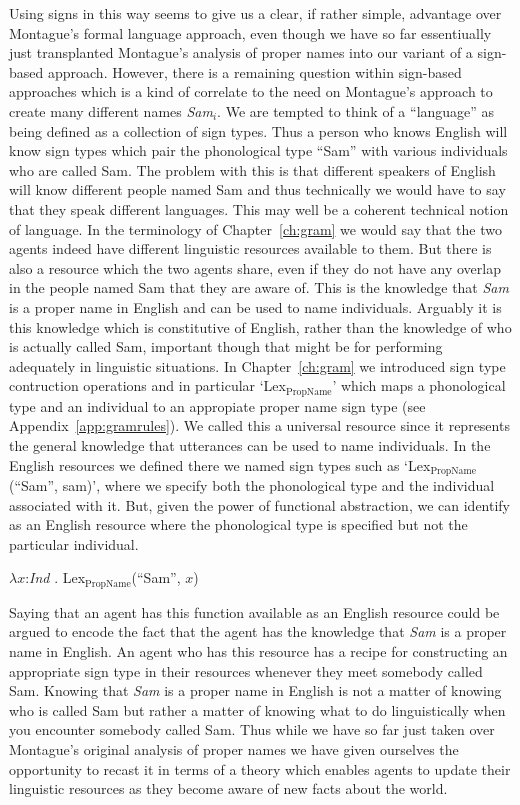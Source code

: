 Using signs in this way seems to give us a clear, if rather simple,
advantage over Montague's formal language approach, even though we
have so far essentiually just transplanted Montague's analysis of
proper names into our variant of a sign-based approach.  However,
there is a remaining question within sign-based approaches which is
a kind of correlate to the need on Montague's approach to create many
different names \textit{Sam}$_i$.  We are tempted to think of a
``language'' as being defined as a collection of sign types.  Thus a
person who knows English will know sign types which pair the
phonological type ``Sam'' with various individuals who are called
Sam.  The problem with this is that different speakers of English will
know different people named Sam and thus technically we would have to
say that they speak different languages.  This may well be a coherent
technical notion of language.  In the terminology of
Chapter~\ref{ch:gram} we would say that the two agents indeed have
different linguistic resources available to them.  But there is also a
resource which the two agents share, even if they do not have any
overlap in the people named Sam that they are aware of.  This is the
knowledge that \textit{Sam} is a proper name in English and can be
used to name individuals.  Arguably it is this knowledge which is
constitutive of English, rather than the knowledge of who is actually
called Sam, important though that might be for performing adequately
in linguistic situations.  In Chapter~\ref{ch:gram} we introduced sign
type contruction operations and in particular
`Lex$_{\mathrm{PropName}}$' which maps a phonological type and an
individual to an appropiate proper name sign type (see
Appendix~\ref{app:gramrules}).  We called this a universal resource
since it represents the general knowledge that utterances can be used
to name individuals.  In the English resources we defined there we
named sign types such as `Lex$_{\mathrm{PropName}}$(``Sam'', sam)',
where we specify both the phonological type and the individual
associated with it.  But, given the power of functional abstraction,
we can identify \nexteg{} as an English resource where the
phonological type is specified but not the particular individual.
\begin{ex} 
$\lambda x$:\textit{Ind} . Lex$_{\mathrm{PropName}}$(``Sam'', $x$)
\label{ex:lexpropnameSamResource} 
\end{ex} 
Saying that an agent has this function available as an English resource could
be argued to encode the fact that the agent has the knowledge that
\textit{Sam} is a proper name in English.  An agent who has this
resource has a recipe for constructing an appropriate sign type in
their resources whenever they meet somebody called Sam.  Knowing that
\textit{Sam} is a proper name in English is not a matter of knowing
who is called Sam but rather a matter of knowing what to do
linguistically when you encounter somebody called Sam.  Thus while we
have so far just taken over Montague's original analysis of proper
names we have given ourselves the opportunity to recast it in terms of
a theory which enables agents to update their linguistic resources as
they become aware of new facts about the world.

